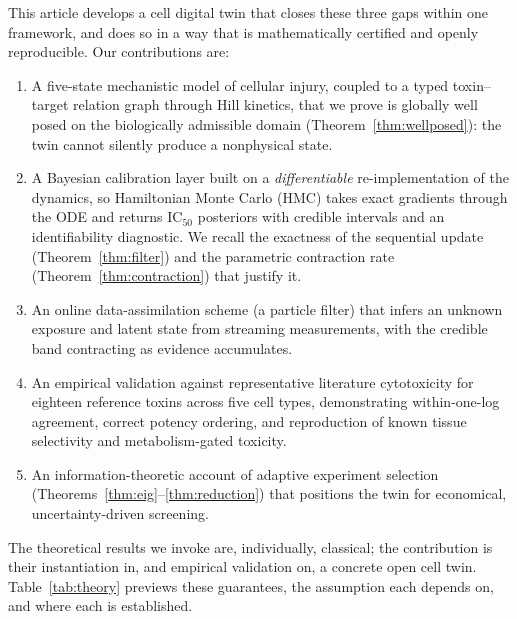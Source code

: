 \documentclass[journal]{IEEEtran}
\begin{document}
This article develops a cell digital twin that closes these three gaps within one
framework, and does so in a way that is mathematically certified and openly
reproducible. Our contributions are:
\begin{enumerate}
\item A five-state mechanistic model of cellular injury, coupled to a typed
toxin--target relation graph through Hill kinetics, that we prove is globally
well posed on the biologically admissible domain (Theorem~\ref{thm:wellposed}):
the twin cannot silently produce a nonphysical state.
\item A Bayesian calibration layer built on a \emph{differentiable}
re-implementation of the dynamics, so Hamiltonian Monte Carlo (HMC) takes exact
gradients through the ODE and returns IC$_{50}$ posteriors with credible
intervals and an identifiability diagnostic. We recall the exactness of the
sequential update (Theorem~\ref{thm:filter}) and the parametric contraction rate
(Theorem~\ref{thm:contraction}) that justify it.
\item An online data-assimilation scheme (a particle filter) that infers an
unknown exposure and latent state from streaming measurements, with the credible
band contracting as evidence accumulates.
\item An empirical validation against representative literature cytotoxicity for
eighteen reference toxins across five cell types, demonstrating within-one-log
agreement, correct potency ordering, and reproduction of known tissue
selectivity and metabolism-gated toxicity.
\item An information-theoretic account of adaptive experiment selection
(Theorems~\ref{thm:eig}--\ref{thm:reduction}) that positions the twin for
economical, uncertainty-driven screening.
\end{enumerate}
The theoretical results we invoke are, individually, classical; the contribution
is their instantiation in, and empirical validation on, a concrete open cell
twin. Table~\ref{tab:theory} previews these guarantees, the assumption each
depends on, and where each is established.
\end{document}
